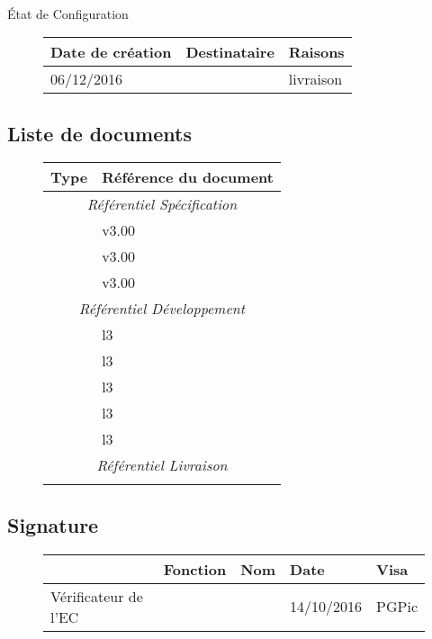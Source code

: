 \documentclass[asi, sansVersion]{picInsa}
\begin{document}
\begin{center}
\huge
\nomEquipe{}\\
État de Configuration\\
\end{center}
\vspace{0.5cm}


\begin{figure}[H]
		\centering
		\begin{tabularx}{17cm}{|p{4cm}|X|X|}
		\hline
		\rowcolor[gray]{0.85}Date de création & Destinataire & Raisons \\
		\hline
		06/12/2016 & \client & livraison \\
		\hline
		\end{tabularx}
\end{figure}

\subsection*{Liste de documents}

\begin{figure}[H]
		\centering
		\begin{tabularx}{17cm}{|p{7cm}|X|}
		\hline
		\rowcolor[gray]{0.85}Type & Référence du document\\
		\hline
		\multicolumn{2}{|c|}{\textit{Référentiel Spécification}}\\
		\hline 
		 \DSE & v3.00  \\
		 \DSI & v3.00  \\
		 \PTV & v3.00  \\		 	 
		\hline 
		\multicolumn{2}{|c|}{\textit{Référentiel Développement}}\\
		\hline
		 \PTU & l3 \\
		 \JTU & l3 \\
		 \PTI & l3 \\
		 \JTI & l3 \\
		 \DCP & l3 \\		 	 		 		 		 
		\hline 
		\multicolumn{2}{|c|}{\textit{Référentiel Livraison}}\\
		\hline
		& \\
		\hline 
		\end{tabularx}
\end{figure}

\subsection*{Signature}

\begin{figure}[H]
		\centering
		\begin{tabularx}{17cm}{|p{4cm}|X|X|X|X|}
		\hline
		\rowcolor[gray]{0.85}& Fonction & Nom & Date & Visa \\
		\hline
		 Vérificateur de l'EC & \RGC & \Melissa & 14/10/2016 & PGPic \\
		\hline
		\end{tabularx}
\end{figure}
\end{document}
